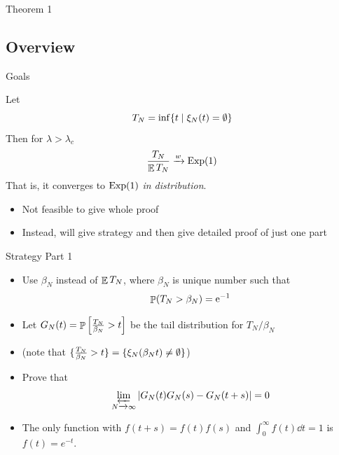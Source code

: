 \documentclass{beamer}
\begin{document}
\begin{frame}{Theorem 1}
  \tableofcontents[currentsection]
\end{frame}

\subsection{Overview}

\begin{frame}{Goals}
  \begin{theorem}
    Let \[ T_{N} = \inf\set{t \st \xi_{N}(t) = \emptyset} \]
    Then for $\lambda > \lambda_{c}$
    \[ \frac{T_{N}}{\E T_{N}} \to[w] \expDist(1) \]
    That is, it converges to $\expDist(1)$ \emph{in distribution}.
  \end{theorem}
  \pause
  \begin{itemize}
    \item Not feasible to give whole proof
          \pause
    \item Instead, will give strategy and then give detailed proof of just one part
  \end{itemize}
\end{frame}

\begin{frame}{Strategy Part 1}
  \begin{itemize}
    \item Use $\beta_{N}$ instead of $\E T_{N}$, where $\beta_{N}$ is unique number such that
    \[ \Prob(T_{N} > \beta_{N}) = \e^{-1} \]
          \pause
    \item Let $G_{N}(t) = \Prob\left[ \frac{T_{N}}{\beta_{N}} > t\right]$ be the tail distribution for $T_{N} / \beta_{N}$
          \pause
    \item(note that $\set{ \frac{T_N}{\beta_N} > t} = \set{\xi_{N}(\beta_{N}t) \neq \emptyset}$)
          \pause
    \item Prove that
          \[ \limas_{N \to \infty} \abs{G_{N}(t)G_{N}(s) - G_{N}(t+s)} = 0 \]
    \item The only function with $f(t+s) = f(t)f(s)$ and $\int_{0}^{\infty} f(t) \dd{t} = 1$ is $f(t) = e^{-t}$.
  \end{itemize}
\end{frame}
\end{document}
